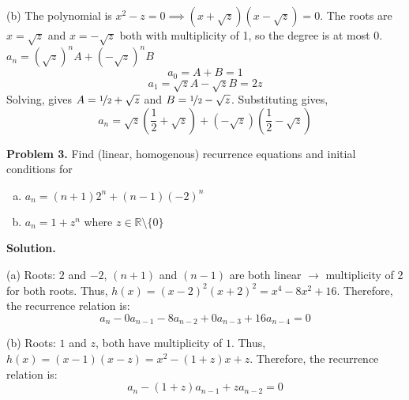 (b) The polynomial is $ x^2-z=0\implies (x+\sqrt{z})(x-\sqrt{z})=0 $.
The roots are $ x=\sqrt{z} $ and $ x=-\sqrt{z} $ both with multiplicity of 1,
so the degree is at most $ 0 $.
$ a_n=(\sqrt{z})^n A + (-\sqrt{z})^n B $
\[ a_0=A+B=1\]
\[ a_1=\sqrt{z}A -\sqrt{z}B=2z \]
Solving, gives $ A=\nicefrac{1}{2} +\sqrt{z} $ and $ B=\nicefrac{1}{2} -\sqrt{z} $.
Substituting gives,
\[ a_n=\sqrt{z}\left(\frac{1}{2} +\sqrt{z}\right)
+(-\sqrt{z})\left(\frac{1}{2} -\sqrt{z}\right) \]


\textbf{Problem 3.} Find (linear, homogenous) recurrence equations and initial
conditions for
\begin{enumerate}[(a)]
    \item $ a_n=(n+1)2^n+(n-1)(-2)^n $
    \item $ a_n=1+z^n $ where $ z\in\mathbb{R}\setminus \{0\} $
\end{enumerate}

\textbf{Solution.}

(a) Roots: $ 2 $ and $ -2 $, $ (n+1) $ and $ (n-1) $ are both linear
$ \rightarrow $ multiplicity of 2 for both
roots. Thus, $ h(x)=(x-2)^2(x+2)^2=x^4-8x^2+16 $. Therefore, the recurrence
relation is:
\[ a_n-0 a_{n-1}-8a_{n-2}+0 a_{n-3}+16a_{n-4}=0 \]

(b) Roots: $ 1 $ and $ z $, both have multiplicity of $ 1 $. Thus,
$ h(x)=(x-1)(x-z)=x^2-(1+z)x+z $. Therefore, the recurrence relation is:
\[ a_n-(1+z)a_{n-1}+z a_{n-2}=0 \]
